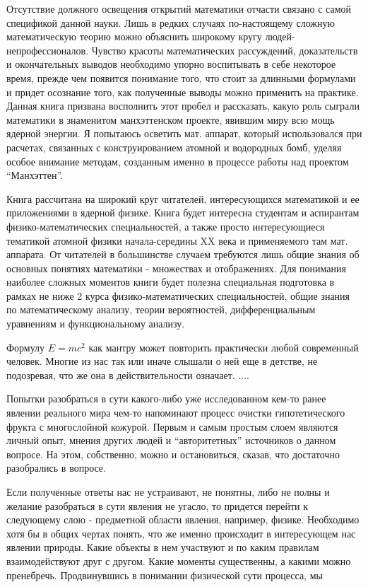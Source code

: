 Отсутствие должного освещения открытий математики отчасти связано с самой спецификой данной науки. Лишь в редких случаях по-настоящему сложную математическую теорию можно объяснить широкому кругу людей-непрофессионалов. Чувство красоты математических рассуждений, доказательств и окончательных выводов необходимо упорно воспитывать в себе некоторое время, прежде чем появится понимание того, что стоит за длинными формулами и придет осознание того, как полученные выводы можно применить на практике.
Данная книга призвана восполнить этот пробел и рассказать, какую роль сыграли математики в знаменитом манхэттенском проекте, явившим миру всю мощь ядерной энергии. Я попытаюсь осветить мат. аппарат, который использовался при расчетах, связанных с конструированием атомной и водородных бомб, уделяя особое внимание методам, созданным именно в процессе работы над проектом “Манхэттен”.

Книга рассчитана на широкий круг читателей, интересующихся математикой и ее приложениями в ядерной физике. Книга будет интересна студентам и аспирантам физико-математических специальностей, а также просто интересующиеся тематикой атомной физики начала-середины XX века и применяемого там мат. аппарата. От читателей в большинстве случаем требуются лишь общие знания об основных понятиях математики - множествах и отображениях. Для понимания наиболее сложных моментов книги будет полезна специальная подготовка в рамках не ниже 2 курса физико-математических специальностей, общие знания по математическому анализу, теории вероятностей, дифференциальным уравнениям и функциональному анализу.






Формулу $E = mc^2$ как мантру может повторить практически любой современный человек.
Многие из нас так или иначе слышали о ней еще в детстве, не подозревая, что же она в действительности означает.
....


Попытки разобраться в сути какого-либо уже исследованном кем-то ранее явлении реального мира чем-то напоминают процесс очистки гипотетического фрукта с многослойной кожурой.
Первым и самым простым слоем являются личный опыт, мнения других людей и ``авторитетных'' источников о данном вопросе. 
На этом, собственно, можно и остановиться, сказав, что достаточно разобрались в вопросе.

Если полученные ответы нас не устраивают, не понятны, либо не полны и желание разобраться в сути явления не угасло, то придется перейти к следующему слою - предметной области явления, например, физике.
Необходимо хотя бы в общих чертах понять, что же именно происходит в интересующем нас явлении природы. 
Какие объекты в нем участвуют и по каким правилам взаимодействуют друг с другом. Какие моменты существенны, а какими можно пренебречь.
Продвинувшись в понимании физической сути процесса, мы 

